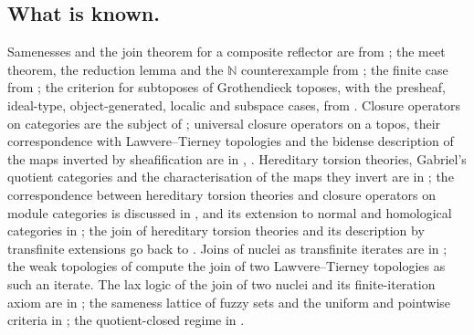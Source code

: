 \documentclass[11pt]{amsart}
\theoremstyle{definition}
\begin{document}
\subsection*{What is known.}
Samenesses and the join theorem for a composite reflector are from
\cite{Same,Postnikov}; the meet theorem, the reduction lemma and the
$\mathbb N$ counterexample from \cite{Topjoin}; the finite case from
\cite{Finitejoin}; the criterion for subtoposes of Grothendieck toposes,
with the presheaf, ideal-type, object-generated, localic and subspace
cases, from \cite{Stabjoin}. Closure operators on categories are the subject
of \cite{DT}; universal closure operators on a topos, their correspondence
with Lawvere--Tierney topologies and the bidense description of the maps
inverted by sheafification are in \cite[V.1, V.3]{MLM},
\cite[A4.3--A4.4]{Elephant}. Hereditary torsion theories, Gabriel's quotient
categories and the characterisation of the maps they invert are in
\cite{Gabriel,Stenstrom}; the correspondence between hereditary torsion
theories and closure operators on module categories is discussed in
\cite{DT}, and its extension to normal and homological categories in
\cite{CDT}; the join of hereditary torsion theories and its description
by transfinite extensions go back to \cite{Dickson}. Joins of nuclei as transfinite iterates are in \cite{Escardo};
the weak topologies of \cite{KM} compute the join of two Lawvere--Tierney
topologies as such an iterate. The lax logic of the join of two nuclei and
its finite-iteration axiom are in \cite{Laxjoin}; the sameness lattice of
fuzzy sets and the uniform and pointwise criteria in \cite{Fuzzysame}; the
quotient-closed regime in \cite{Varieties}.
\end{document}
